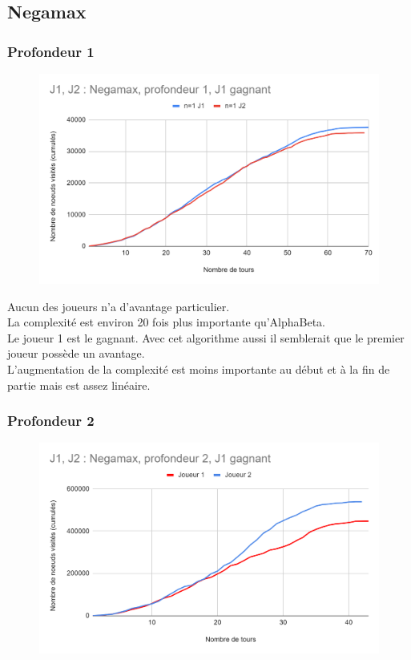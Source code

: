\documentclass[12pt]{article}
\begin{document}
\newpage
\subsection{Negamax}

\subsubsection{Profondeur 1}

\begin{figure}[!h]
   \includegraphics[width=\textwidth]{prof1negamax.png}
\end{figure}

Aucun des joueurs n’a d’avantage particulier.\\
La complexité est environ 20 fois plus importante qu’AlphaBeta.\\
Le joueur 1 est le gagnant. Avec cet algorithme aussi il semblerait que le premier joueur possède un avantage.\\
L’augmentation de la complexité est moins importante au début et à la fin de partie mais est assez linéaire.

\newpage
\subsubsection{Profondeur 2}

\begin{figure}[!h]
   \includegraphics[width=\textwidth]{prof2negamax.png}
\end{figure}
\end{document}
